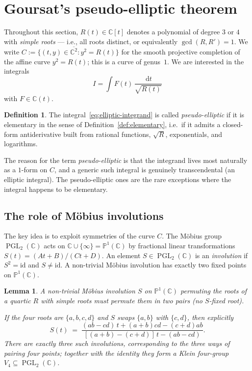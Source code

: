\documentclass[11pt,a4paper]{article}
\theoremstyle{plain}
\newtheorem{lemma}[theorem]{Lemma}
\theoremstyle{definition}
\newtheorem{definition}[theorem]{Definition}
\theoremstyle{remark}
\newcommand{\C}{\mathbb{C}}
\newcommand{\PGL}{\operatorname{PGL}}
\renewcommand{\d}{\,\mathrm{d}}
\begin{document}
\section{Goursat's pseudo-elliptic theorem}
\label{sec:goursat}

Throughout this section, $R(t)\in\C[t]$ denotes a polynomial of degree $3$ or $4$ with \emph{simple roots} — i.e., all roots distinct, or equivalently $\gcd(R,R') = 1$. We write $C := \{(t,y)\in\overline{\C^2} : y^2 = R(t)\}$ for the smooth projective completion of the affine curve $y^2=R(t)$; this is a curve of genus~$1$. We are interested in the integrals
\begin{equation}\label{eq:elliptic-integrand}
  I = \int F(t)\,\frac{\d t}{\sqrt{R(t)}}
\end{equation}
with $F\in\C(t)$.

\begin{definition}\label{def:pseudo-elliptic}
The integral~\eqref{eq:elliptic-integrand} is called \emph{pseudo-elliptic} if it is elementary in the sense of Definition~\ref{def:elementary}, i.e.\ if it admits a closed-form antiderivative built from rational functions, $\sqrt{R}$, exponentials, and logarithms.
\end{definition}

The reason for the term \emph{pseudo-elliptic} is that the integrand lives most naturally as a $1$-form on $C$, and a generic such integral is genuinely transcendental (an elliptic integral). The pseudo-elliptic ones are the rare exceptions where the integral happens to be elementary.

\subsection{The role of M\"obius involutions}

The key idea is to exploit symmetries of the curve $C$. The M\"obius group $\PGL_2(\C)$ acts on $\C\cup\{\infty\}=\mathbb{P}^1(\C)$ by fractional linear transformations $S(t) = (At+B)/(Ct+D)$. An element $S \in \PGL_2(\C)$ is an \emph{involution} if $S^2 = \mathrm{id}$ and $S\neq \mathrm{id}$. A non-trivial M\"obius involution has exactly two fixed points on $\mathbb{P}^1(\C)$.

\begin{lemma}\label{lem:involutions-pairs}
A non-trivial M\"obius involution $S$ on $\mathbb{P}^1(\C)$ permuting the roots of a quartic $R$ with simple roots must permute them in two pairs (no $S$-fixed root).

If the four roots are $\{a,b,c,d\}$ and $S$ swaps $\{a,b\}$ with $\{c,d\}$, then explicitly
\begin{equation}\label{eq:involution-formula}
  S(t) \;=\; \frac{(ab-cd)\,t + (a+b)cd - (c+d)ab}{[(a+b)-(c+d)]\,t - (ab-cd)}.
\end{equation}
There are exactly three such involutions, corresponding to the three ways of pairing four points; together with the identity they form a Klein four-group $V_4 \subseteq \PGL_2(\C)$.
\end{lemma}
\end{document}
